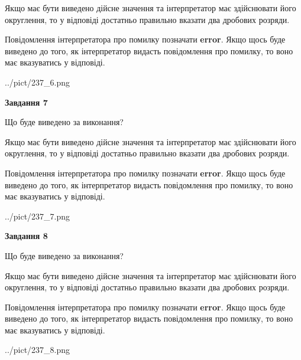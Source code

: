 \documentclass[12pt, ukrainian]{article}
\begin{document}
{\begin {Large}
Якщо має бути виведено дійсне значення та інтерпретатор має здійснювати його округлення, 
то у відповіді достатньо правильно вказати два дробових розряди.

Повідомлення інтерпретатора про помилку позначати \textbf{error}.
Якщо щось буде виведено до того, як інтерпретатор видасть повідомлення про помилку, 
то воно має вказуватись у відповіді. \par

\begin{center}
	{../pict/237_6.png}
\end{center}
\newpage

{\begin {center}\textbf{Завдання 7}\end {center}}\par
Що буде виведено за виконання? \par

Якщо має бути виведено дійсне значення та інтерпретатор має здійснювати його округлення, 
то у відповіді достатньо правильно вказати два дробових розряди.

Повідомлення інтерпретатора про помилку позначати \textbf{error}.
Якщо щось буде виведено до того, як інтерпретатор видасть повідомлення про помилку, 
то воно має вказуватись у відповіді. \par

\begin{center}
	{../pict/237_7.png}
\end{center}
\newpage

{\begin {center}\textbf{Завдання 8}\end {center}}\par
Що буде виведено за виконання? \par

Якщо має бути виведено дійсне значення та інтерпретатор має здійснювати його округлення, 
то у відповіді достатньо правильно вказати два дробових розряди.

Повідомлення інтерпретатора про помилку позначати \textbf{error}.
Якщо щось буде виведено до того, як інтерпретатор видасть повідомлення про помилку, 
то воно має вказуватись у відповіді. \par

\begin{center}
	{../pict/237_8.png}
\end{center}
\newpage


\end{Large}}
\end{document}
